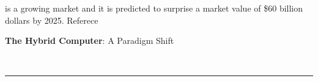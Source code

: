 \documentclass[12pt]{article}
\begin{document}
     is a growing market and it is predicted to surprise a market value of \$60 billion dollars by 2025. {\color{rojo}Referece}
    
    \clearpage
    
     \centerline{\Large\textbf{{The Hybrid Computer}}:
                               {A Paradigm Shift}}\
     \vspace{-7.5mm}\hrule\vspace{-2.5mm}
    
\end{document}
